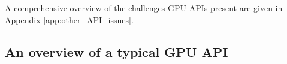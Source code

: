 \documentclass[a4paper,12pt,twoside,openright]{report}
\begin{document}
A comprehensive overview of the challenges GPU APIs present are given in
Appendix \ref{app:other_API_issues}.

\subsection{An overview of a typical GPU API}

\label{sec:graphics_api_overview}



\end{document}
